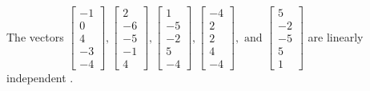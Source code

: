 \begin{exercise}
\begin{exerciseStatement}
  \end{exerciseStatement}
  \begin{exerciseAnswer}
   The vectors \(\left[\begin{array}{r}
-1 \\
0 \\
4 \\
-3 \\
-4
\end{array}\right] , \left[\begin{array}{r}
2 \\
-6 \\
-5 \\
-1 \\
4
\end{array}\right] , \left[\begin{array}{r}
1 \\
-5 \\
-2 \\
5 \\
-4
\end{array}\right] , \left[\begin{array}{r}
-4 \\
2 \\
2 \\
4 \\
-4
\end{array}\right] , \text{ and } \left[\begin{array}{r}
5 \\
-2 \\
-5 \\
5 \\
1
\end{array}\right]\) are 
  	 linearly independent  .
  


  \end{exerciseAnswer}
\end{exercise}